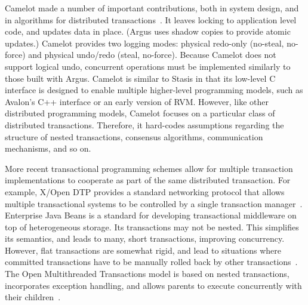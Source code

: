 \documentclass[letterpaper,twocolumn,10pt]{article}
\newcommand{\yad}{Stasis\xspace}
\begin{document}
Camelot made a number of important contributions, both in system
design, and in algorithms for distributed transactions~\cite{camelot}.
It leaves locking to application level code, and updates data in
place.  (Argus uses shadow copies to provide atomic updates.)  Camelot
provides two logging modes: physical redo-only (no-steal, no-force)
and physical undo/redo (steal, no-force).  Because Camelot does not
support logical undo, concurrent operations must be implemented
similarly to those built with Argus.  Camelot is similar to \yad in
that its low-level C interface is designed to enable multiple
higher-level programming models, such as Avalon's C++ interface or an
early version of RVM.  However, like other distributed programming
models, Camelot focuses on a particular class of distributed
transactions.  Therefore, it hard-codes assumptions regarding the
structure of nested transactions, consensus algorithms, communication
mechanisms, and so on.


More recent transactional programming schemes allow for multiple
transaction implementations to cooperate as part of the same
distributed transaction.  For example, X/Open DTP provides a standard
networking protocol that allows multiple transactional systems to be
controlled by a single transaction manager~\cite{dtp}.
Enterprise Java Beans is a standard for developing transactional
middleware on top of heterogeneous storage.  Its
transactions may not be nested.  This simplifies its
semantics, and leads to many, short transactions, 
improving concurrency.  However, flat transactions are somewhat rigid, and lead to
situations where committed transactions have to be manually rolled
back by other transactions~\cite{ejbCritique}.  The Open
Multithreaded Transactions model is based on nested transactions,
incorporates exception handling, and allows parents to execute
concurrently with their children~\cite{omtt}.
\end{document}
